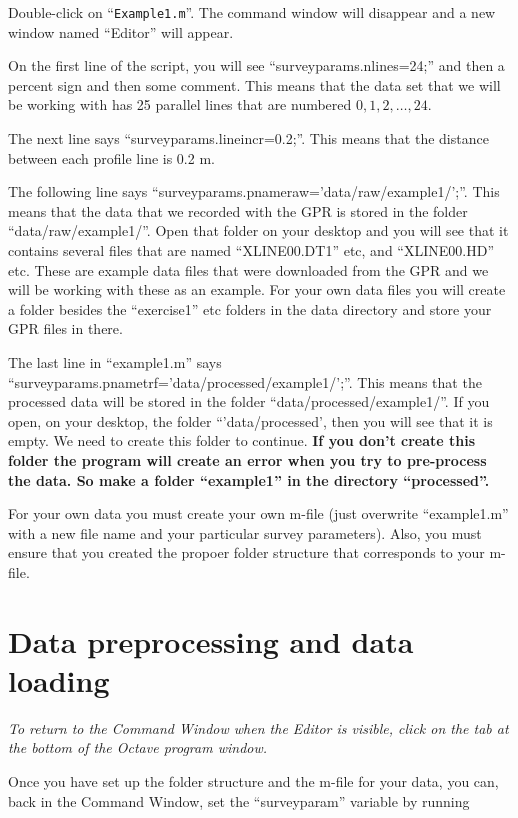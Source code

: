 \documentclass[11pt]{article}
\begin{document}
Double-click on ``\verb#Example1.m#''. The command window will disappear and
a new window named ``Editor'' will appear.

On the first line of the script, you will see ``surveyparams.nlines=24;'' 
and then a percent sign and then some comment.  This means that the data
set that we will be working with has 25 parallel lines that are
numbered $0, 1, 2, \ldots, 24$.

The next line says ``surveyparams.lineincr=0.2;''. This means that the
distance between each profile line is 0.2 m.

The following line says
``surveyparams.pnameraw='data/raw/example1/';''. This means that the
data that we recorded with the GPR is stored in the folder
``data/raw/example1/''. Open that folder on your desktop and you will
see that it contains several files that are named ``XLINE00.DT1'' etc,
and ``XLINE00.HD'' etc. These are example data files that were
downloaded from the GPR and we will be working with these as an
example. For your own data files you will create a folder besides the
``exercise1'' etc folders in the data directory and store your GPR
files in there.

The last line in ``example1.m'' says
``surveyparams.pnametrf='data/processed/example1/';''. This means that
the processed data will be stored in the folder
``data/processed/example1/''. If you open, on your desktop, the folder
``'data/processed', then you will see that it is empty. We need to
create this folder to continue. \textbf{If you don't create this folder
  the program will create an error when you try to pre-process the
  data. So make a folder ``example1'' in the directory ``processed''.}

For your own data you must create your own m-file (just overwrite 
``example1.m'' with a new file name and your particular survey parameters).
Also, you must ensure that you created the propoer folder structure 
that corresponds to your m-file.

\section{Data preprocessing and data loading}
\emph{To return to the Command Window when the Editor is visible,
  click on the tab at the bottom of the Octave program window.}

Once you have set up the folder structure and the m-file for your
data, you can, back in the Command Window, set the ``surveyparam''
variable by running
\end{document}
